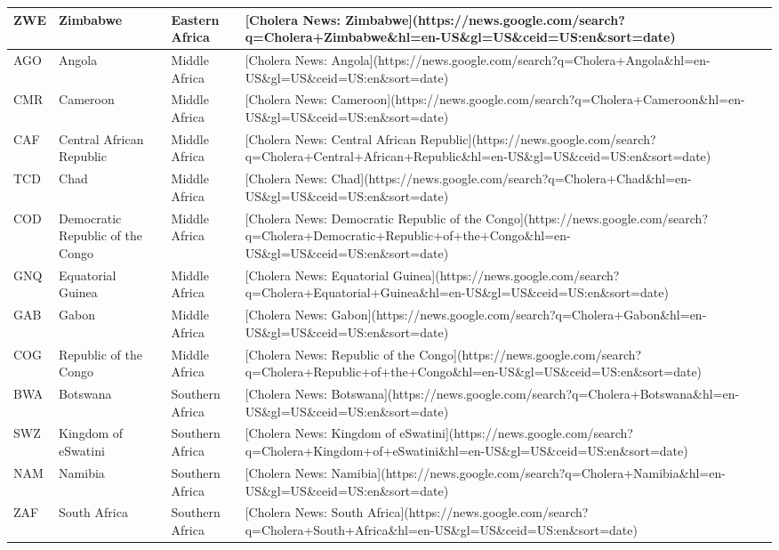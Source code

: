\documentclass[
]{book}
\begin{document}
\begin{table}
\begin{tabular}[t]{l|l|l|l}
\hline
ZWE & Zimbabwe & Eastern Africa & [Cholera News: Zimbabwe](https://news.google.com/search?q=Cholera+Zimbabwe\&hl=en-US\&gl=US\&ceid=US:en\&sort=date)\\
\hline
AGO & Angola & Middle Africa & [Cholera News: Angola](https://news.google.com/search?q=Cholera+Angola\&hl=en-US\&gl=US\&ceid=US:en\&sort=date)\\
\hline
CMR & Cameroon & Middle Africa & [Cholera News: Cameroon](https://news.google.com/search?q=Cholera+Cameroon\&hl=en-US\&gl=US\&ceid=US:en\&sort=date)\\
\hline
CAF & Central African Republic & Middle Africa & [Cholera News: Central African Republic](https://news.google.com/search?q=Cholera+Central+African+Republic\&hl=en-US\&gl=US\&ceid=US:en\&sort=date)\\
\hline
TCD & Chad & Middle Africa & [Cholera News: Chad](https://news.google.com/search?q=Cholera+Chad\&hl=en-US\&gl=US\&ceid=US:en\&sort=date)\\
\hline
COD & Democratic Republic of the Congo & Middle Africa & [Cholera News: Democratic Republic of the Congo](https://news.google.com/search?q=Cholera+Democratic+Republic+of+the+Congo\&hl=en-US\&gl=US\&ceid=US:en\&sort=date)\\
\hline
GNQ & Equatorial Guinea & Middle Africa & [Cholera News: Equatorial Guinea](https://news.google.com/search?q=Cholera+Equatorial+Guinea\&hl=en-US\&gl=US\&ceid=US:en\&sort=date)\\
\hline
GAB & Gabon & Middle Africa & [Cholera News: Gabon](https://news.google.com/search?q=Cholera+Gabon\&hl=en-US\&gl=US\&ceid=US:en\&sort=date)\\
\hline
COG & Republic of the Congo & Middle Africa & [Cholera News: Republic of the Congo](https://news.google.com/search?q=Cholera+Republic+of+the+Congo\&hl=en-US\&gl=US\&ceid=US:en\&sort=date)\\
\hline
BWA & Botswana & Southern Africa & [Cholera News: Botswana](https://news.google.com/search?q=Cholera+Botswana\&hl=en-US\&gl=US\&ceid=US:en\&sort=date)\\
\hline
SWZ & Kingdom of eSwatini & Southern Africa & [Cholera News: Kingdom of eSwatini](https://news.google.com/search?q=Cholera+Kingdom+of+eSwatini\&hl=en-US\&gl=US\&ceid=US:en\&sort=date)\\
\hline
NAM & Namibia & Southern Africa & [Cholera News: Namibia](https://news.google.com/search?q=Cholera+Namibia\&hl=en-US\&gl=US\&ceid=US:en\&sort=date)\\
\hline
ZAF & South Africa & Southern Africa & [Cholera News: South Africa](https://news.google.com/search?q=Cholera+South+Africa\&hl=en-US\&gl=US\&ceid=US:en\&sort=date)\\

\end{tabular}
\end{table}
\end{document}

